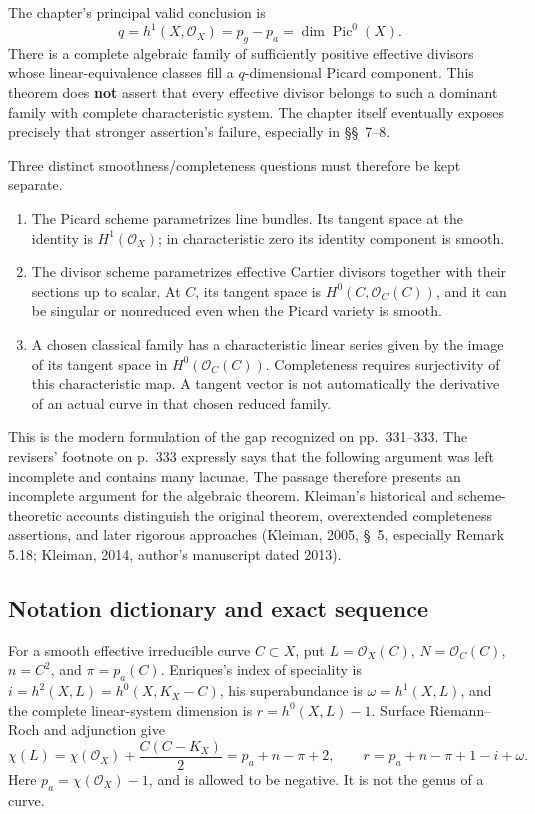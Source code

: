 The chapter's principal valid conclusion is
\[
q=h^1(X,\mathcal O_X)=p_g-p_a=\dim\operatorname{Pic}^0(X).
\]
There is a complete algebraic family of sufficiently positive effective divisors whose linear-equivalence classes fill a \(q\)-dimensional Picard component. This theorem does \textbf{not} assert that every effective divisor belongs to such a dominant family with complete characteristic system. The chapter itself eventually exposes precisely that stronger assertion's failure, especially in \S\S~7--8.

Three distinct smoothness/completeness questions must therefore be kept separate.

\begin{enumerate}
\item The Picard scheme parametrizes line bundles. Its tangent space at the identity is \(H^1(\mathcal O_X)\); in characteristic zero its identity component is smooth.
\item The divisor scheme parametrizes effective Cartier divisors together with their sections up to scalar. At \(C\), its tangent space is \(H^0(C,\mathcal O_C(C))\), and it can be singular or nonreduced even when the Picard variety is smooth.
\item A chosen classical family has a characteristic linear series given by the image of its tangent space in \(H^0(\mathcal O_C(C))\). Completeness requires surjectivity of this characteristic map. A tangent vector is not automatically the derivative of an actual curve in that chosen reduced family.

\end{enumerate}
This is the modern formulation of the gap recognized on pp.~331--333. The revisers' footnote on p.~333 expressly says that the following argument was left incomplete and contains many lacunae. The passage therefore presents an incomplete argument for the algebraic theorem. Kleiman's historical and scheme-theoretic accounts distinguish the original theorem, overextended completeness assertions, and later rigorous approaches (Kleiman, 2005, \S~5, especially Remark 5.18; Kleiman, 2014, author's manuscript dated 2013).

\subsection{Notation dictionary and exact sequence}\label{cp2-ix-1-1}

For a smooth effective irreducible curve \(C\subset X\), put \(L=\mathcal O_X(C)\), \(N=\mathcal O_C(C)\), \(n=C^2\), and \(\pi=p_a(C)\). Enriques's index of speciality is \(i=h^2(X,L)=h^0(X,K_X-C)\), his superabundance is \(\omega=h^1(X,L)\), and the complete linear-system dimension is \(r=h^0(X,L)-1\). Surface Riemann--Roch and adjunction give
\[
\chi(L)=\chi(\mathcal O_X)+\frac{C(C-K_X)}2
       =p_a+n-\pi+2,\qquad
r=p_a+n-\pi+1-i+\omega.
\]
Here \(p_a=\chi(\mathcal O_X)-1\), and is allowed to be negative. It is not the genus of a curve.

